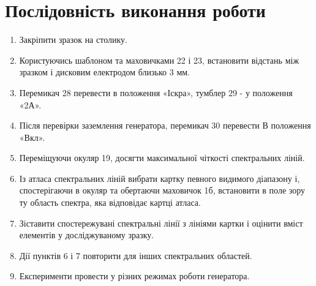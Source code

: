 \documentclass[twocolumn]{el-author}
\begin{document}

\newpage
\section{Послідовність виконання роботи}

\begin{enumerate}
	\item  Закріпити зразок на столику.
	\item Користуючись шаблоном та маховичками 22 і 23, встановити відстань
між зразком і дисковим електродом близько 3 мм.
	\item Перемикач 28 перевести в положення «Іскра», тумблер 29 - у
положення «2А».
	\item Після перевірки заземлення генератора, перемикач 30 перевести В
положення «Вкл».
	\item Переміщуючи окуляр 19, досягти максимальної чіткості спектральних
ліній.
	\item  Із атласа спектральних ліній вибрати картку певного видимого
діапазону і, спостерігаючи в окуляр та обертаючи маховичок 1б,
встановити в поле зору ту область спектра, яка відповідає картці
атласа.
	\item Зіставити спостережувані спектральні лінії з лініями картки і оцінити
	вміст елементів у досліджуваному зразку.
	\item Дії пунктів 6 і 7 повторити для інших спектральних областей.
	\item Експерименти провести у різних режимах роботи генератора.
\end{enumerate}
\end{document}
